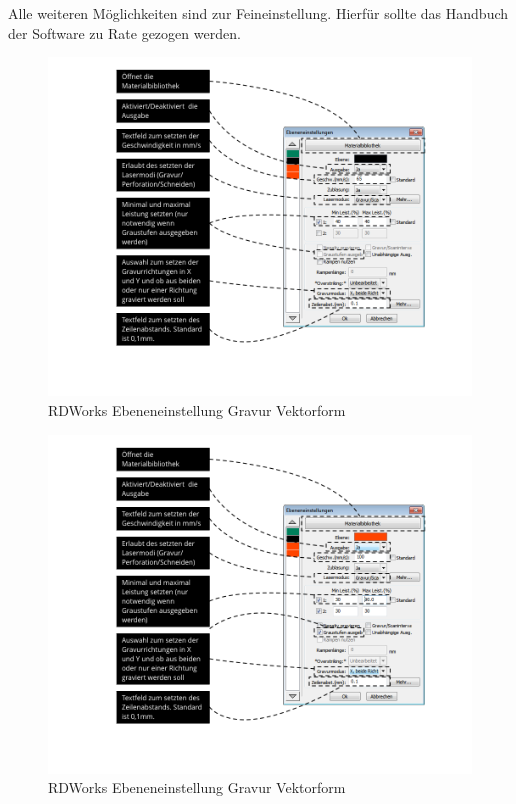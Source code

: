 \documentclass[]{article}
\begin{document}
Alle weiteren Möglichkeiten sind zur Feineinstellung. Hierfür sollte das
Handbuch der Software zu Rate gezogen werden.

\begin{figure}
\hypertarget{fig:rdgrav1}{%
\centering
\includegraphics{assets/images/rdworks-gravieren1.PNG}
\caption{RDWorks Ebeneneinstellung Gravur Vektorform}\label{fig:rdgrav1}
}
\end{figure}

\begin{figure}
\hypertarget{fig:rdgrav2}{%
\centering
\includegraphics{assets/images/rdworks-gravur2.PNG}
\caption{RDWorks Ebeneneinstellung Gravur Vektorform}\label{fig:rdgrav2}
}
\end{figure}
\end{document}
